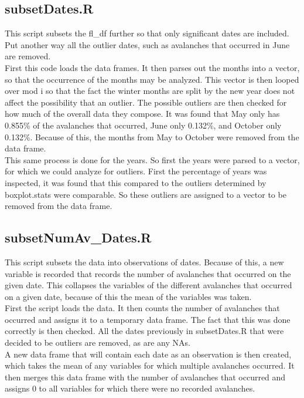 \documentclass[12pt]{article}
\begin{document}
\subsection*{subsetDates.R}
This script subsets the fl\_df further so that only significant dates are included.  Put another way all the outlier dates, such as avalanches that occurred in June are removed.\\

First this code loads the data frames.  It then parses out the months into a vector, so that the occurrence of the months may be analyzed.  This vector is then looped over mod i so that the fact the winter months are split by the new year does not affect the possibility that an outlier.  The possible outliers are then checked for how much of the overall data they compose.  It was found that May only has 0.855\% of the avalanches that occurred, June only 0.132\%, and October only 0.132\%.  Because of this, the months from May to October were removed from the data frame.\\

This same process is done for the years.  So first the years were parsed to a vector, for which we could analyze for outliers.  First the percentage of years was inspected, it was found that this compared to the outliers determined by boxplot.stats were comparable.  So these outliers are assigned to a vector to be removed from the data frame.

\subsection*{subsetNumAv\_Dates.R}
This script subsets the data into observations of dates.  Because of this, a new variable is recorded that records the number of avalanches that occurred on the given date.  This collapses the variables of the different avalanches that occurred on a given date, because of this the mean of the variables was taken.\\

First the script loads the data.  It then counts the number of avalanches that occurred and assigns it to a temporary data frame.  The fact that this was done correctly is then checked.
All the dates previously in subsetDates.R that were decided to be outliers are removed, as are any NAs.\\

A new data frame that will contain each date as an observation is then created, which takes the mean of any variables for which multiple avalanches occurred. It then merges this data frame with the number of avalanches that occurred and assigns 0 to all variables for which there were no recorded avalanches.
\end{document}
